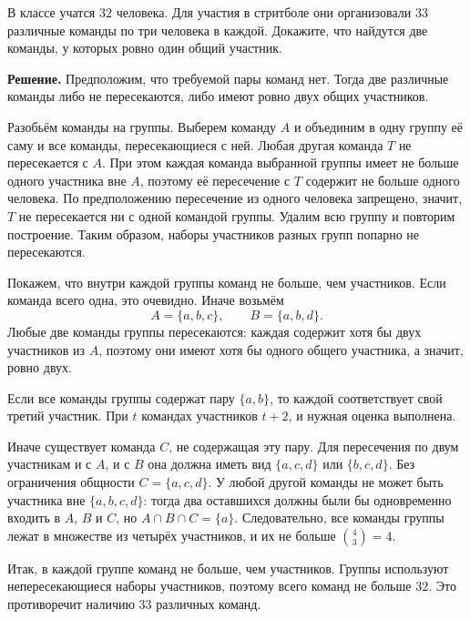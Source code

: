 \begin{problems}
\item В классе учатся $32$ человека. Для участия в стритболе они организовали $33$ различные команды по три человека в каждой. Докажите, что найдутся две команды, у которых ровно один общий участник.
\par\smallskip\noindent\textbf{Решение.} Предположим, что требуемой пары команд нет. Тогда две различные команды либо не пересекаются, либо имеют ровно двух общих участников.
\par Разобьём команды на группы. Выберем команду $A$ и объединим в одну группу её саму и все команды, пересекающиеся с ней. Любая другая команда $T$ не пересекается с $A$. При этом каждая команда выбранной группы имеет не больше одного участника вне $A$, поэтому её пересечение с $T$ содержит не больше одного человека. По предположению пересечение из одного человека запрещено, значит, $T$ не пересекается ни с одной командой группы. Удалим всю группу и повторим построение. Таким образом, наборы участников разных групп попарно не пересекаются.
\par Покажем, что внутри каждой группы команд не больше, чем участников. Если команда всего одна, это очевидно. Иначе возьмём
\[
A=\{a,b,c\},\qquad B=\{a,b,d\}.
\]
Любые две команды группы пересекаются: каждая содержит хотя бы двух участников из $A$, поэтому они имеют хотя бы одного общего участника, а значит, ровно двух.
\par Если все команды группы содержат пару $\{a,b\}$, то каждой соответствует свой третий участник. При $t$ командах участников $t+2$, и нужная оценка выполнена.
\par Иначе существует команда $C$, не содержащая эту пару. Для пересечения по двум участникам и с $A$, и с $B$ она должна иметь вид $\{a,c,d\}$ или $\{b,c,d\}$. Без ограничения общности $C=\{a,c,d\}$. У любой другой команды не может быть участника вне $\{a,b,c,d\}$: тогда два оставшихся должны были бы одновременно входить в $A$, $B$ и $C$, но $A\cap B\cap C=\{a\}$. Следовательно, все команды группы лежат в множестве из четырёх участников, и их не больше $\binom43=4$.
\par Итак, в каждой группе команд не больше, чем участников. Группы используют непересекающиеся наборы участников, поэтому всего команд не больше $32$. Это противоречит наличию $33$ различных команд.\par


\end{problems}
